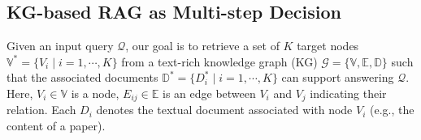 

\subsection{KG-based RAG as Multi-step Decision}
Given an input query $\mathcal{Q}$, our goal is to retrieve a set of $K$ target nodes $\mathbb{V}^{*}=\{V_{i} \mid i=1,\cdots,K\}$ from a text-rich knowledge graph (KG) $\mathcal{G} = \{\mathbb{V}, \mathbb{E}, \mathbb{D}\}$ such that the associated documents $\mathbb{D}^{*} = \{D^{*}_{i} \mid i=1,\cdots,K\}$ can support answering $\mathcal{Q}$. Here, $V_{i} \in \mathbb{V}$ is a node, $E_{ij} \in \mathbb{E}$ is an edge between $V_{i}$ and $V_{j}$ indicating their relation. Each $D_{i}$ denotes the textual document associated with node $V_{i}$ (e.g., the content of a paper).


